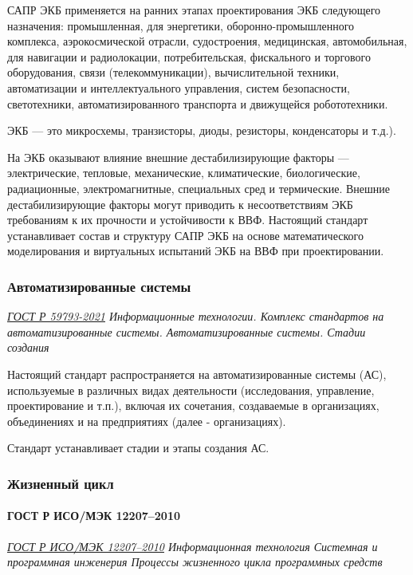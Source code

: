 САПР ЭКБ применяется на ранних этапах проектирования ЭКБ следующего назначения:
промышленная, для энергетики, оборонно-промышленного комплекса,
аэрокосмической отрасли, судостроения, медицинская, автомобильная,
для навигации и радиолокации, потребительская, фискального
и торгового оборудования, связи (телекоммуникации), вычислительной техники,
автоматизации и интеллектуального управления, систем безопасности,
светотехники, автоматизированного транспорта и движущейся робототехники.

ЭКБ --- это микросхемы, транзисторы, диоды, резисторы, конденсаторы и т.д.).

На ЭКБ оказывают влияние внешние дестабилизирующие факторы --- электрические,
тепловые, механические, климатические, биологические, радиационные,
электромагнитные, специальных сред и термические.
Внешние дестабилизирующие факторы могут приводить
к несоответствиям ЭКБ требованиям к их прочности и устойчивости к ВВФ.
Настоящий стандарт устанавливает состав
и структуру САПР ЭКБ на основе математического моделирования
и виртуальных испытаний ЭКБ на ВВФ при проектировании.

\subsubsection{Автоматизированные системы}

\emph{\href{https://docs.cntd.ru/document/1200181349}{ГОСТ Р 59793-2021}
Информационные технологии.
Комплекс стандартов на автоматизированные системы.
Автоматизированные системы. Стадии создания
}

Настоящий стандарт распространяется на автоматизированные системы (АС),
используемые в различных видах деятельности
(исследования, управление, проектирование и т.п.),
включая их сочетания, создаваемые в организациях,
объединениях и на предприятиях (далее - организациях).

Стандарт устанавливает стадии и этапы создания АС.

\subsubsection{Жизненный цикл}

\paragraph{ГОСТ Р ИСО/МЭК 12207--2010}

\emph{\href{https://docs.cntd.ru/document/1200082859}
{ГОСТ Р ИСО/МЭК 12207--2010}
Информационная технология
Системная и программная инженерия
Процессы жизненного цикла программных средств
}

